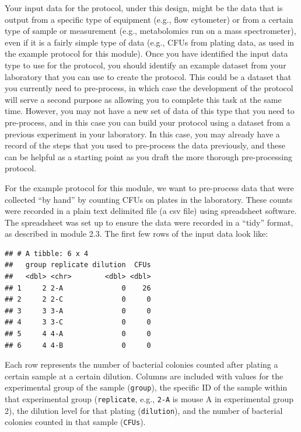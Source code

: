 \documentclass[]{tufte-book}
\begin{document}
Your input data for the protocol, under this design, might be the
data that is output from a specific type of equipment (e.g., flow cytometer) or
from a certain type of sample or measurement (e.g., metabolomics run on a mass
spectrometer), even if it is a fairly simple type of data (e.g., CFUs from
plating data, as used in the example protocol for this module). Once you
have identified the input data type to use for the protocol, you should
identify an example dataset from your laboratory that you can use to create
the protocol. This could be a dataset that you currently need to pre-process,
in which case the development of the protocol will serve a second purpose
as allowing you to complete this task at the same time. However, you may not
have a new set of data of this type that you need to pre-process, and in this
case you can build your protocol using a dataset from a previous
experiment in your laboratory. In this case, you may already have a record
of the steps that you used to pre-process the data previously, and these
can be helpful as a starting point as you draft the more thorough pre-processing
protocol.

For the example protocol for this module, we want to pre-process data that were
collected ``by hand'' by counting CFUs on plates in the laboratory. These counts
were recorded in a plain text delimited file (a csv file) using spreadsheet
software. The spreadsheet was set up to ensure the data were recorded in a
``tidy'' format, as described in module 2.3. The first few rows of the input data
look like:

\begin{verbatim}
## # A tibble: 6 x 4
##   group replicate dilution  CFUs
##   <dbl> <chr>        <dbl> <dbl>
## 1     2 2-A              0    26
## 2     2 2-C              0     0
## 3     3 3-A              0     0
## 4     3 3-C              0     0
## 5     4 4-A              0     0
## 6     4 4-B              0     0
\end{verbatim}

Each row represents the number of bacterial colonies counted after plating a
certain sample at a certain dilution. Columns are included with values for the
experimental group of the sample (\texttt{group}), the specific ID of the sample within
that experimental group (\texttt{replicate}, e.g., \texttt{2-A} is mouse A in experimental
group 2), the dilution level for that plating (\texttt{dilution}), and the number of
bacterial colonies counted in that sample (\texttt{CFUs}).
\end{document}
